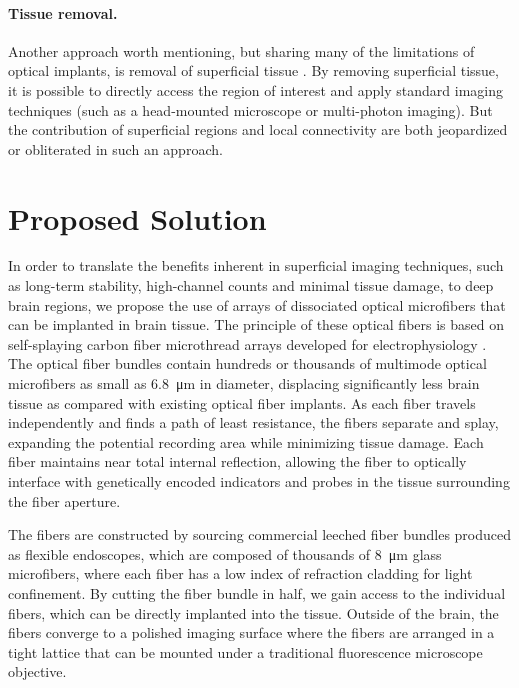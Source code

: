 \paragraph{Tissue removal.} Another approach worth mentioning, 
but sharing many of the limitations of optical implants, is 
removal of superficial tissue \cite{Dombeck:2010jr}. By 
removing superficial tissue, it is possible to directly access 
the region of interest and apply standard imaging techniques 
(such as a head-mounted microscope or multi-photon imaging). 
But the contribution of superficial regions and local connectivity 
are both jeopardized or obliterated in such an approach.

\section{Proposed Solution}

In order to translate the benefits inherent in superficial 
imaging techniques, such as long-term stability, high-channel 
counts and minimal tissue damage, to deep brain regions, we 
propose the use of arrays of dissociated optical microfibers 
that can be implanted in brain tissue. The principle of these 
optical fibers is based on self-splaying carbon fiber microthread 
arrays developed for electrophysiology 
\cite{Guitchounts:2013bs,Markowitz:2015ko}. The optical fiber 
bundles contain hundreds or thousands of multimode 
optical microfibers as small as 6.8~\si{\micro\meter} in diameter, 
displacing significantly less brain tissue as 
compared with existing optical fiber implants. As each 
fiber travels independently and finds a path of least 
resistance, the fibers separate and splay, expanding 
the potential recording area while minimizing tissue 
damage. Each fiber maintains near total internal reflection, 
allowing the fiber to optically interface with genetically 
encoded indicators and probes in the tissue surrounding the 
fiber aperture.

The fibers are constructed by sourcing commercial leeched 
fiber bundles produced as flexible endoscopes, which are 
composed of thousands of 8~\si{\micro\meter} glass microfibers, 
where each fiber has a low index of refraction cladding for 
light confinement. By cutting the fiber bundle in half, we 
gain access to the individual fibers, which can be directly 
implanted into the tissue. Outside of the brain, the fibers 
converge to a polished imaging surface where the fibers are 
arranged in a tight lattice that can be mounted under a 
traditional fluorescence microscope objective.

